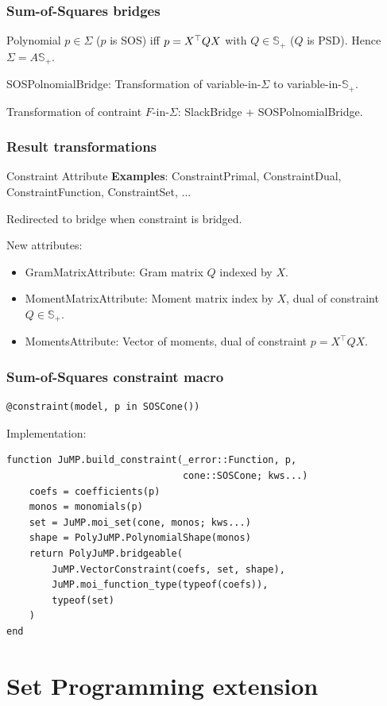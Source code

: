 \documentclass{beamer}
\begin{document}
\begin{frame}
  \frametitle{Sum-of-Squares bridges}
  Polynomial $p \in \Sigma$ ($p$ is SOS) iff
  $p = X^\top Q X$ with $Q \in \mathbb{S}_+$ ($Q$ is PSD).
  Hence $\Sigma = A \mathbb{S}_+$.

  SOSPolnomialBridge: Transformation of variable-in-$\Sigma$ to variable-in-$\mathbb{S}_+$.

  Transformation of contraint $F$-in-$\Sigma$: SlackBridge + SOSPolnomialBridge.
\end{frame}

\begin{frame}
  \frametitle{Result transformations}
  \begin{block}{Constraint Attribute}
    \textbf{Examples}: ConstraintPrimal, ConstraintDual, ConstraintFunction, ConstraintSet, ...

    \alert{Redirected} to bridge when constraint is bridged.
  \end{block}
  New attributes:
  \begin{itemize}
    \item GramMatrixAttribute: Gram matrix $Q$ indexed by $X$.
    \item MomentMatrixAttribute: Moment matrix index by $X$, dual of constraint $Q \in \mathbb{S}_+$.
    \item MomentsAttribute: Vector of moments, dual of constraint $p = X^\top Q X$.
  \end{itemize}
\end{frame}

\begin{frame}[fragile]
  \frametitle{Sum-of-Squares constraint macro}
\begin{verbatim}
@constraint(model, p in SOSCone())
\end{verbatim}
  Implementation:
\begin{verbatim}
function JuMP.build_constraint(_error::Function, p,
                               cone::SOSCone; kws...)
    coefs = coefficients(p)
    monos = monomials(p)
    set = JuMP.moi_set(cone, monos; kws...)
    shape = PolyJuMP.PolynomialShape(monos)
    return PolyJuMP.bridgeable(
        JuMP.VectorConstraint(coefs, set, shape),
        JuMP.moi_function_type(typeof(coefs)),
        typeof(set)
    )
end
\end{verbatim}
\end{frame}

\section{Set Programming extension}
\end{document}

